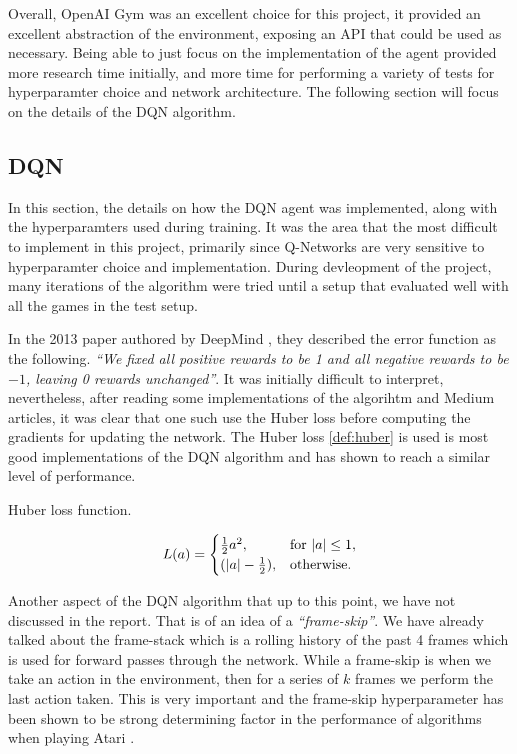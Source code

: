 Overall, OpenAI Gym was an excellent choice for this project, it provided an excellent abstraction of the environment, exposing an API that could be used as necessary. Being able to just focus on the implementation of the agent provided more research time initially, and more time for performing a variety of tests for hyperparamter choice and network architecture. The following section will focus on the details of the DQN algorithm.

\subsection{DQN}
In this section, the details on how the DQN agent was implemented, along with the hyperparamters used during training. It was the area that the most difficult to implement in this project, primarily since Q-Networks are very sensitive to hyperparamter choice and implementation. During devleopment of the project, many iterations of the algorithm were tried until a setup that evaluated well with all the games in the test setup.

In the 2013 paper authored by DeepMind \cite{dqn}, they described the error function as the following. \textit{``We fixed all positive rewards to be 1 and all negative rewards to be $-1$, leaving 0 rewards unchanged''}. It was initially difficult to interpret, nevertheless, after reading some implementations of the algorihtm and Medium articles, it was clear that one such use the Huber loss before computing the gradients for updating the network. The Huber loss \ref{def:huber} is used is most good implementations of the DQN algorithm and has shown to reach a similar level of performance.

\begin{defn}
	Huber loss function.

	\begin{equation}
		L(a)=\begin{cases}
			\frac{1}{2}a^2,          & \text{for $\abs{a} \leq 1$}, \\
			(\abs{a} - \frac{1}{2}), & \text{otherwise}.
		\end{cases}
	\end{equation}
	\label{def:huber}
\end{defn}

Another aspect of the DQN algorithm that up to this point, we have not discussed in the report. That is of an idea of a \textit{``frame-skip''}. We have already talked about the frame-stack which is a rolling history of the past 4 frames which is used for forward passes through the network. While a frame-skip is when we take an action in the environment, then for a series of $k$ frames we perform the last action taken. This is very important and the frame-skip hyperparameter has been shown to be strong determining factor in the performance of algorithms when playing Atari \cite{braylan2015frame}.


